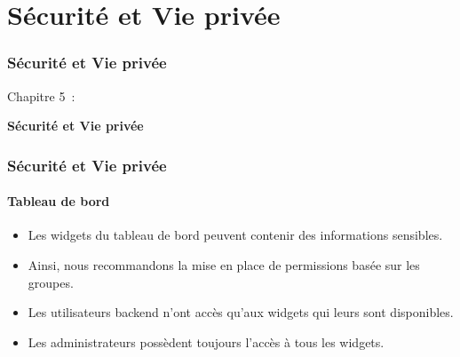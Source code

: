 %

\section{Sécurité et Vie privée}
\begin{frame}[fragile]
	\frametitle{Sécurité et Vie privée}

	\begin{center}\huge{Chapitre 5~:}\end{center}
	\begin{center}\huge{\color{typo3darkgrey}\textbf{Sécurité et Vie privée}}\end{center}

\end{frame}


\begin{frame}[fragile]
	\frametitle{Sécurité et Vie privée}
	\framesubtitle{Tableau de bord}

	\begin{itemize}
		\item Les widgets du tableau de bord peuvent contenir des informations sensibles.
		\item Ainsi, nous recommandons la mise en place de permissions basée sur les groupes.
		\item Les utilisateurs backend n'ont accès qu'aux widgets qui leurs sont disponibles.
		\item Les administrateurs possèdent toujours l'accès à tous les widgets.
	\end{itemize}

\end{frame}


